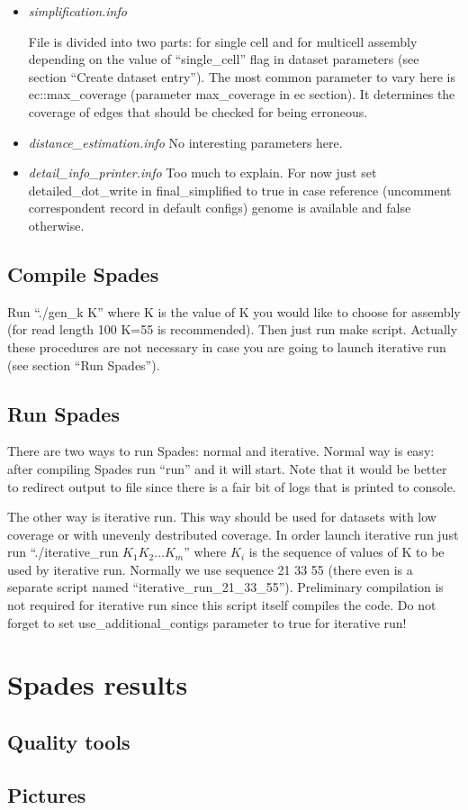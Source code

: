 \documentclass[a4paper,10pt]{article}
\begin{document}
\begin{itemize}
\item {\it simplification.info}

File is divided into two parts: for single cell and for multicell assembly depending on the value of ``single\_cell'' flag in dataset parameters (see section ``Create dataset entry'').
The most common parameter to vary here is ec::max\_coverage (parameter max\_coverage in ec section). It determines the coverage of edges that should be checked for being erroneous.

\item {\it distance\_estimation.info}
No interesting parameters here.

\item {\it detail\_info\_printer.info}
Too much to explain. For now just set detailed\_dot\_write in final\_simplified to true in case reference (uncomment correspondent record in default configs) genome is available and false otherwise.
\end{itemize}


\subsection{Compile Spades}
Run ``./gen_k K'' where K is the value of K you would like to choose for assembly (for read length 100 K=55 is recommended).
Then just run make script.
Actually these procedures are not necessary in case you are going to launch iterative run (see section ``Run Spades'').

\subsection{Run Spades}
There are two ways to run Spades: normal and iterative. Normal way is easy: after compiling Spades run ``run'' and it will start. Note that it would be better to redirect output to file since there is a fair bit of logs that is printed to console.

The other way is iterative run.
This way should be used for datasets with low coverage or with unevenly destributed coverage. 
In order launch iterative run just run ``./iterative\_run $K_1 K_2 \dots K_m$'' where $K_i$ is the sequence of values of K to be used by iterative run.
Normally we use sequence 21 33 55 (there even is a separate script named ``iterative\_run\_21\_33\_55'').
Preliminary compilation is not required for iterative run since this script itself compiles the code.
Do not forget to set use_additional_contigs parameter to true for iterative run!

\section{Spades results}
\subsection{Quality tools}
\subsection{Pictures}
\end{document}
